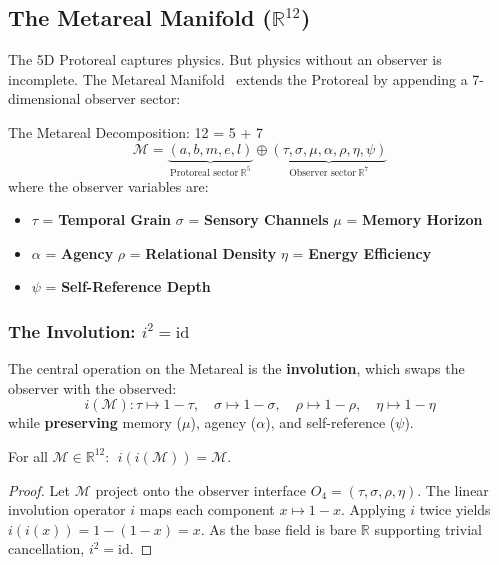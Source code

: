 \subsection{The Metareal Manifold ($\mathbb{R}^{12}$)}

The 5D Protoreal captures physics. But physics without an observer is incomplete. The Metareal Manifold~\cite{MetarealManifold} extends the Protoreal by appending a 7-dimensional observer sector:

\begin{metarealbox}{The Metareal Decomposition: 12 = 5 + 7}
\begin{equation}
    \mathcal{M} = \underbrace{(a, b, m, e, l)}_{\text{Protoreal sector} \ \mathbb{R}^5} \oplus \underbrace{(\tau, \sigma, \mu, \alpha, \rho, \eta, \psi)}_{\text{Observer sector} \ \mathbb{R}^7}
\end{equation}
where the observer variables are:
\begin{itemize}
    \item $\tau$ = \textbf{Temporal Grain} \quad $\sigma$ = \textbf{Sensory Channels} \quad $\mu$ = \textbf{Memory Horizon}
    \item $\alpha$ = \textbf{Agency} \quad $\rho$ = \textbf{Relational Density} \quad $\eta$ = \textbf{Energy Efficiency}
    \item $\psi$ = \textbf{Self-Reference Depth}
\end{itemize}
\end{metarealbox}

\subsubsection{The Involution: $i^2 = \mathrm{id}$}

The central operation on the Metareal is the \textbf{involution}, which swaps the observer with the observed:
\begin{equation}
    i(\mathcal{M}) : \tau \mapsto 1 - \tau, \quad \sigma \mapsto 1 - \sigma, \quad \rho \mapsto 1 - \rho, \quad \eta \mapsto 1 - \eta
\end{equation}
while \textbf{preserving} memory ($\mu$), agency ($\alpha$), and self-reference ($\psi$).

\begin{theorem}
\label{thm:involute}
For all $\mathcal{M} \in \mathbb{R}^{12}$: $\;i(i(\mathcal{M})) = \mathcal{M}$.
\end{theorem}
\begin{proof}
Let $\mathcal{M}$ project onto the observer interface $O_4 = (\tau, \sigma, \rho, \eta)$. The linear involution operator $i$ maps each component $x \mapsto 1 - x$. Applying $i$ twice yields $i(i(x)) = 1 - (1 - x) = x$. As the base field is bare $\mathbb{R}$ supporting trivial cancellation, $i^2 = \mathrm{id}$. \qedhere
\end{proof}

